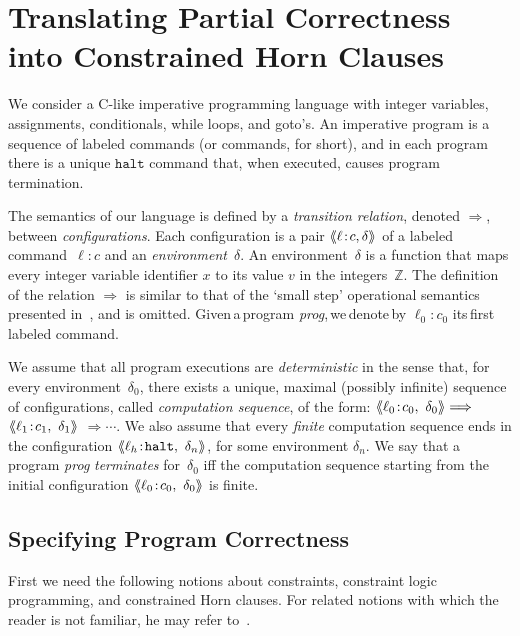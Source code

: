 \documentclass[english]{tlp}
\newcommand{\aaL}{\langle{\hspace*{-2.5pt}}\langle}
\newcommand{\aaR}{\rangle{\hspace*{-2.5pt}}\rangle}
\begin{document}
\section{Translating Partial Correctness into Constrained Horn Clauses}
\label{sec:encoding}


We consider a C-like imperative programming language with integer 
variables, assignments, conditionals, while loops, and goto's.
An imperative  program is a sequence of labeled commands (or commands, for short), 
and in each program there is a unique
$\mathtt{halt}$ command that, when executed, causes program termination.

The semantics of our language is defined by a {\it transition relation},  denoted 
$\Longrightarrow$, between {\it configurations}. Each configuration is a pair
$\aaL \ell\!:\!c, \delta\aaR$ of a labeled command~$\ell\!:\!c$ and an 
{\it environment}~$\delta$.
An {environment}~$\delta$ is a function 
that maps every integer variable identifier $x$ to its value $v$ 
in the integers~$\mathbb Z$.
The definition of the relation $\Longrightarrow$ is similar to that of the
`{small step}' operational semantics presented in~\cite{Rey98},
and is omitted.
Given\,a\,program \textit{prog},\,we\,denote\,by 
$\ell_0\!:\!c_0$ its\,first\,labeled command.

We assume that all program executions are {\it deterministic} in the sense that,
for every environment~$\delta_0$,
there exists a unique, maximal (possibly infinite) 
sequence of configurations, called {\it computation sequence}, 
of the form: $\aaL \ell_0\!:\!c_{0}, \ \delta_0\aaR \Longrightarrow$
\mbox{$\aaL \ell_1\!:\!c_{1}, \ \delta_1\aaR$} $ \Longrightarrow \cdots $.
We also assume that every {\it finite} computation sequence ends in the configuration
$\aaL \ell_{h}\!:\!\mathtt{halt}, \ \delta_n\aaR$, for some environment $\delta_n$.
We say that  a program \textit{prog}  {\it terminates} for~$\delta_0$ iff 
the computation sequence
starting from the initial configuration $\aaL \ell_0\!:\!c_{0}, \ \delta_0\aaR$ 
is finite.

\newpage

\subsection{Specifying Program Correctness}
\label{subsec:Spec}


First we need the following notions about constraints, 
constraint logic programming, and constrained Horn clauses. 
For related notions with which the reader is not
 familiar, he may refer to~\cite{JaM94,Llo87}.
\end{document}
